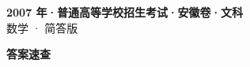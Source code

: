\documentclass[zihao=-4, a4paper]{ctexart}
\begin{document}
\begin{center}
  {\Large\bfseries 2007 年·普通高等学校招生考试·安徽卷·文科}\\[4pt]
  {\large 数学 · 简答版}
\end{center}
\medskip
{}

\clearpage
{}
\begin{center}{\Large\bfseries 答案速查}\end{center}
\medskip

\end{document}
